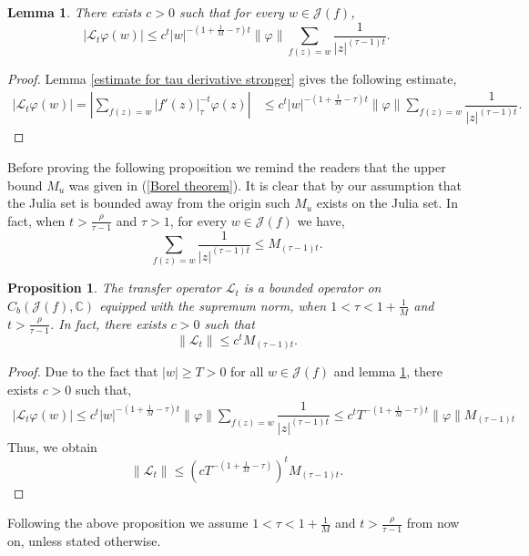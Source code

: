 \documentclass[12pt,reqno]{amsart}
\newtheorem{lemma}[theorem]{Lemma}
\newtheorem{proposition}[theorem]{Proposition}
\begin{document}
\begin{lemma}\label{estimate for transfer operator}
    There exists $c>0$ such that for every $w \in \mathcal{J}(f)$,
         $$|\mathcal{L}_t \varphi (w)|\leq c^t|w|^{-(1+\frac{1}{M}-\tau)t}\|\varphi\|\sum_{f(z)=w}\dfrac{1}{|z|^{(\tau-1)t}}.$$
\end{lemma}
\begin{proof}
   Lemma \ref{estimate for tau derivative stronger} gives the following estimate,
    \begin{align*}
        |\mathcal{L}_t \varphi(w)|=\left|\sum_{f(z)=w}|f'(z)|_{\tau}^{-t}\varphi(z)\right| & \leq c^{t}|w|^{-(1+\frac{1}{M}-\tau)t}\|\varphi\|\sum_{f(z)=w}\dfrac{1}{|z|^{(\tau-1)t}}.
    \end{align*}
\end{proof}
\noindent Before proving the following proposition we remind the readers that the upper bound $M_u$ was given in (\ref{Borel theorem}). It is clear that by our assumption that the Julia set is bounded away from the origin such $M_u$ exists on the Julia set. In fact, when $t> \frac{\rho}{\tau -1}$ and $\tau>1$, for every $w \in \mathcal{J}(f)$ we have,
\begin{equation}\label{Borel theorem 2}
    \sum_{f(z)=w}\dfrac{1}{|z|^{(\tau-1)t}} \leq M_{(\tau-1)t}.
\end{equation}
\begin{proposition}\label{boundedness of transfer operator}
     The transfer operator $\mathcal{L}_t$ is a bounded operator on $C_b(\mathcal{J}(f),\mathbb{C})$ equipped with the supremum norm, when $ 1<\tau<1+\frac{1}{M}$ and $t> \frac{\rho}{\tau -1}$. In fact, there exists $c>0$ such that 
     $$\|\mathcal{L}_t\| \leq c^tM_{(\tau-1)t}.$$
\end{proposition}
\begin{proof}
    Due to the fact that $|w| \geq T>0$ for all $w \in \mathcal{J}(f)$ and lemma \ref{estimate for transfer operator}, there exists $c>0$ such that,
    \begin{align*}
        | \mathcal{L}_t\varphi(w)|\leq c^t|w|^{-(1+\frac{1}{M}-\tau)t}\|\varphi\|\sum_{f(z)=w}\dfrac{1}{|z|^{(\tau-1)t}} \leq c^tT^{-(1+\frac{1}{M}-\tau)t}\|\varphi\|M_{(\tau-1)t}
    \end{align*}
    Thus, we obtain
    $$ \|\mathcal{L}_t\| \leq (cT^{-(1+\frac{1}{M}-\tau)})^tM_{(\tau-1)t}. $$
    \end{proof}
\noindent    Following the above proposition we assume $ 1<\tau<1+\frac{1}{M}$ and $t> \frac{\rho}{\tau -1}$ from now on, unless stated otherwise.
 
\end{document}
